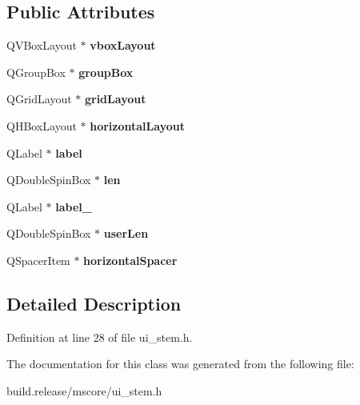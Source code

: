 \subsection*{Public Attributes}
\begin{DoxyCompactItemize}
\item 
\mbox{\label{class_ui___stem_base_ad42ccb4cdf8302ac7fce884a6b799930}} 
Q\+V\+Box\+Layout $\ast$ {\bfseries vbox\+Layout}
\item 
\mbox{\label{class_ui___stem_base_a52dfbf718a5be75f7b8de381fd5d5acb}} 
Q\+Group\+Box $\ast$ {\bfseries group\+Box}
\item 
\mbox{\label{class_ui___stem_base_ad96c28372fb91eb6c6be2b8d618db659}} 
Q\+Grid\+Layout $\ast$ {\bfseries grid\+Layout}
\item 
\mbox{\label{class_ui___stem_base_adc6919481ed6a52d6f803f51fab80f27}} 
Q\+H\+Box\+Layout $\ast$ {\bfseries horizontal\+Layout}
\item 
\mbox{\label{class_ui___stem_base_a555c705ad5fcccd9b37313874a57d0a4}} 
Q\+Label $\ast$ {\bfseries label}
\item 
\mbox{\label{class_ui___stem_base_a573d4854dfe1b4b847a3dd470091a29d}} 
Q\+Double\+Spin\+Box $\ast$ {\bfseries len}
\item 
\mbox{\label{class_ui___stem_base_a0dcdc7ba4a474d57cb4740ddce120453}} 
Q\+Label $\ast$ {\bfseries label\+\_}
\item 
\mbox{\label{class_ui___stem_base_a6453eb3f03ceedec881e0afba382e369}} 
Q\+Double\+Spin\+Box $\ast$ {\bfseries user\+Len}
\item 
\mbox{\label{class_ui___stem_base_a7cfd10446972f866f6cec7dfbb8e8fc3}} 
Q\+Spacer\+Item $\ast$ {\bfseries horizontal\+Spacer}
\end{DoxyCompactItemize}


\subsection{Detailed Description}


Definition at line 28 of file ui\+\_\+stem.\+h.



The documentation for this class was generated from the following file\+:\begin{DoxyCompactItemize}
\item 
build.\+release/mscore/ui\+\_\+stem.\+h\end{DoxyCompactItemize}

